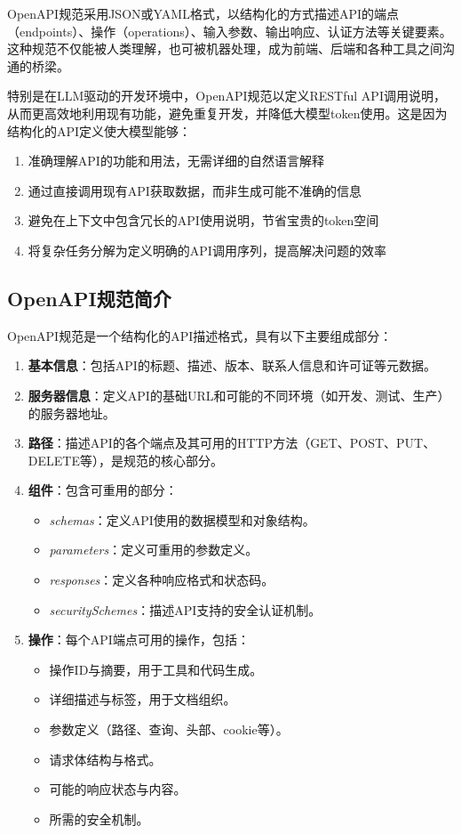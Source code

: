 OpenAPI规范采用JSON或YAML格式，以结构化的方式描述API的端点（endpoints）、操作（operations）、输入参数、输出响应、认证方法等关键要素。这种规范不仅能被人类理解，也可被机器处理，成为前端、后端和各种工具之间沟通的桥梁。

特别是在LLM驱动的开发环境中，OpenAPI规范以定义RESTful API调用说明，从而更高效地利用现有功能，避免重复开发，并降低大模型token使用。这是因为结构化的API定义使大模型能够：
\begin{enumerate}
  \item 准确理解API的功能和用法，无需详细的自然语言解释
  \item 通过直接调用现有API获取数据，而非生成可能不准确的信息
  \item 避免在上下文中包含冗长的API使用说明，节省宝贵的token空间
  \item 将复杂任务分解为定义明确的API调用序列，提高解决问题的效率
\end{enumerate}

\subsection{OpenAPI规范简介}
OpenAPI规范是一个结构化的API描述格式，具有以下主要组成部分\cite{openapi2023spec}：

\begin{enumerate}
  \item \textbf{基本信息}：包括API的标题、描述、版本、联系人信息和许可证等元数据。
  
  \item \textbf{服务器信息}：定义API的基础URL和可能的不同环境（如开发、测试、生产）的服务器地址。
  
  \item \textbf{路径}：描述API的各个端点及其可用的HTTP方法（GET、POST、PUT、DELETE等），是规范的核心部分。
  
  \item \textbf{组件}：包含可重用的部分：
    \begin{itemize}
      \item \textit{schemas}：定义API使用的数据模型和对象结构。
      \item \textit{parameters}：定义可重用的参数定义。
      \item \textit{responses}：定义各种响应格式和状态码。
      \item \textit{securitySchemes}：描述API支持的安全认证机制。
    \end{itemize}
  
  \item \textbf{操作}：每个API端点可用的操作，包括：
    \begin{itemize}
      \item 操作ID与摘要，用于工具和代码生成。
      \item 详细描述与标签，用于文档组织。
      \item 参数定义（路径、查询、头部、cookie等）。
      \item 请求体结构与格式。
      \item 可能的响应状态与内容。
      \item 所需的安全机制。
    \end{itemize}
\end{enumerate}

